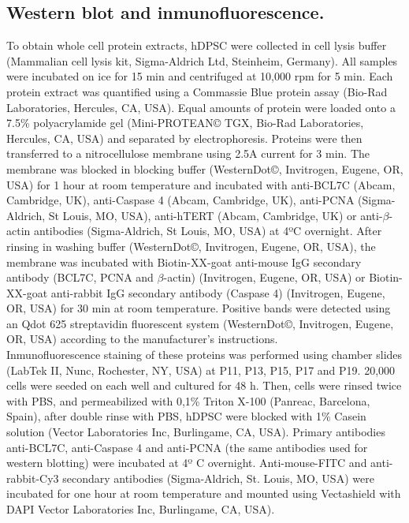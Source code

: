 \documentclass[a4paper,twocolumn,12pt]{article}
\begin{document}
\subsection{Western blot and inmunofluorescence.}
To obtain whole cell protein extracts, hDPSC were collected in cell lysis buffer (Mammalian cell lysis kit, Sigma-Aldrich Ltd, Steinheim, Germany). All samples were incubated on ice for 15 min and centrifuged at 10,000 rpm for 5 min. Each protein extract was quantified using a Commassie Blue protein assay (Bio-Rad Laboratories, Hercules, CA, USA). Equal amounts of protein were loaded onto a 7.5\% polyacrylamide gel (Mini-PROTEAN© TGX, Bio-Rad Laboratories, Hercules, CA, USA) and separated by electrophoresis. Proteins were then transferred to a nitrocellulose membrane using 2.5A current for 3 min. The membrane was blocked in blocking buffer (WesternDot©, Invitrogen, Eugene, OR, USA) for 1 hour at room temperature and incubated with anti-BCL7C (Abcam, Cambridge, UK), anti-Caspase 4 (Abcam, Cambridge, UK), anti-PCNA (Sigma-Aldrich, St Louis, MO, USA), anti-hTERT (Abcam, Cambridge, UK) or anti-$\beta$-actin antibodies (Sigma-Aldrich, St Louis, MO, USA) at 4ºC overnight. After rinsing in washing buffer (WesternDot©, Invitrogen, Eugene, OR, USA), the membrane was incubated with Biotin-XX-goat anti-mouse IgG secondary antibody (BCL7C, PCNA and $\beta$-actin) (Invitrogen, Eugene, OR, USA) or Biotin-XX-goat anti-rabbit IgG secondary antibody (Caspase 4) (Invitrogen, Eugene, OR, USA) for 30 min at room temperature. Positive bands were detected using an Qdot 625 streptavidin fluorescent system (WesternDot©, Invitrogen, Eugene, OR, USA) according to the manufacturer’s instructions.\\
Inmunofluorescence staining of these proteins was performed using chamber slides (LabTek II, Nunc, Rochester, NY, USA) at P11, P13, P15, P17 and P19. 20,000 cells were seeded on each well and cultured for 48 h. Then, cells were rinsed twice with PBS, and permeabilized with 0,1\% Triton X-100 (Panreac, Barcelona, Spain), after double rinse with PBS, hDPSC were blocked with 1\% Casein solution (Vector Laboratories Inc, Burlingame, CA, USA). Primary antibodies anti-BCL7C, anti-Caspase 4 and anti-PCNA (the same antibodies used for western blotting) were incubated at 4º C overnight. Anti-mouse-FITC and anti-rabbit-Cy3 secondary antibodies (Sigma-Aldrich, St. Louis, MO, USA) were incubated for one hour at room temperature and mounted using Vectashield with DAPI Vector Laboratories Inc, Burlingame, CA, USA).\\
\end{document}
